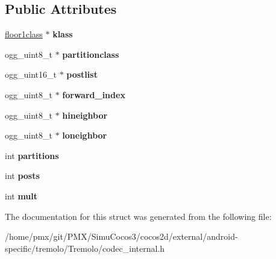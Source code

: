\subsection*{Public Attributes}
\begin{DoxyCompactItemize}
\item 
\mbox{\label{structvorbis__info__floor1_ae877409b519e6734d14dd1dc382908c9}} 
\hyperlink{structfloor1class}{floor1class} $\ast$ {\bfseries klass}
\item 
\mbox{\label{structvorbis__info__floor1_ab805d03a5d2c27373ce6a93959f9bc54}} 
ogg\+\_\+uint8\+\_\+t $\ast$ {\bfseries partitionclass}
\item 
\mbox{\label{structvorbis__info__floor1_a25c9492f6e870f0f3565286ba5dcce7a}} 
ogg\+\_\+uint16\+\_\+t $\ast$ {\bfseries postlist}
\item 
\mbox{\label{structvorbis__info__floor1_aea3741435c9532d5551fd7be7ccd657b}} 
ogg\+\_\+uint8\+\_\+t $\ast$ {\bfseries forward\+\_\+index}
\item 
\mbox{\label{structvorbis__info__floor1_a4a4a132b2b7eab6e37b90c0c9c0554ef}} 
ogg\+\_\+uint8\+\_\+t $\ast$ {\bfseries hineighbor}
\item 
\mbox{\label{structvorbis__info__floor1_a0627ad70cc6ad8181a0c459c8ea7a075}} 
ogg\+\_\+uint8\+\_\+t $\ast$ {\bfseries loneighbor}
\item 
\mbox{\label{structvorbis__info__floor1_a0888c238296237fca49e63f4c684b4b1}} 
int {\bfseries partitions}
\item 
\mbox{\label{structvorbis__info__floor1_a1fdc48fe2a675e3733e26821d0ed9887}} 
int {\bfseries posts}
\item 
\mbox{\label{structvorbis__info__floor1_a431d5bb1a6aec9746726cfdf737d5ac0}} 
int {\bfseries mult}
\end{DoxyCompactItemize}


The documentation for this struct was generated from the following file\+:\begin{DoxyCompactItemize}
\item 
/home/pmx/git/\+P\+M\+X/\+Simu\+Cocos3/cocos2d/external/android-\/specific/tremolo/\+Tremolo/codec\+\_\+internal.\+h\end{DoxyCompactItemize}
